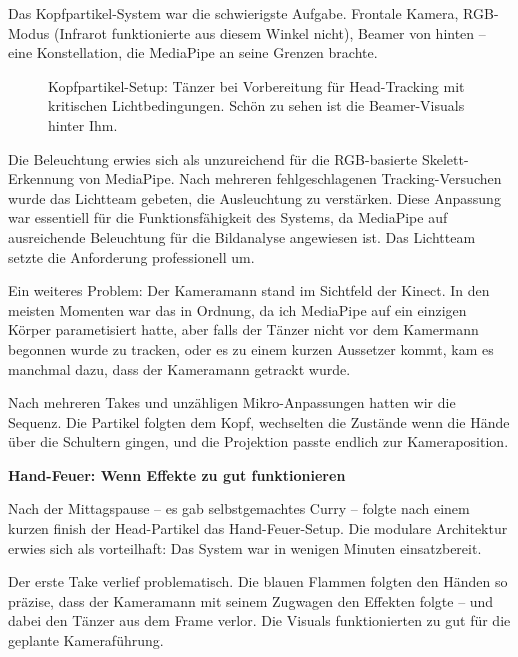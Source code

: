 \raggedright Das Kopfpartikel-System war die schwierigste Aufgabe. Frontale Kamera, RGB-Modus (Infrarot funktionierte aus diesem Winkel nicht), Beamer von hinten – eine Konstellation, die MediaPipe an seine Grenzen brachte.

\begin{figure}[htbp]
    \centering
    \caption{Kopfpartikel-Setup: Tänzer bei Vorbereitung für Head-Tracking mit kritischen Lichtbedingungen. Schön zu sehen ist die Beamer-Visuals hinter Ihm.}
    \label{fig:dancer_head_tracking}
\end{figure}


Die Beleuchtung erwies sich als unzureichend für die RGB-basierte Skelett-Erkennung von MediaPipe. Nach mehreren fehlgeschlagenen Tracking-Versuchen wurde das Lichtteam gebeten, die Ausleuchtung zu verstärken. Diese Anpassung war essentiell für die Funktionsfähigkeit des Systems, da MediaPipe auf ausreichende Beleuchtung für die Bildanalyse angewiesen ist. Das Lichtteam setzte die Anforderung professionell um.



Ein weiteres Problem: Der Kameramann stand im Sichtfeld der Kinect. In den meisten Momenten war das in Ordnung, da ich MediaPipe auf ein einzigen Körper parametisiert hatte, aber falls der Tänzer nicht vor dem Kamermann begonnen wurde zu tracken, oder es zu einem kurzen Aussetzer kommt, kam es manchmal dazu, dass der Kameramann getrackt wurde.

Nach mehreren Takes und unzähligen Mikro-Anpassungen hatten wir die Sequenz. Die Partikel folgten dem Kopf, wechselten die Zustände wenn die Hände über die Schultern gingen, und die Projektion passte endlich zur Kameraposition.


\newpage

\textbf{Hand-Feuer: Wenn Effekte zu gut funktionieren}

\raggedright Nach der Mittagspause – es gab selbstgemachtes Curry – folgte nach einem kurzen finish der Head-Partikel das Hand-Feuer-Setup. Die modulare Architektur erwies sich als vorteilhaft: Das System war in wenigen Minuten einsatzbereit.


Der erste Take verlief problematisch. Die blauen Flammen folgten den Händen so präzise, dass der Kameramann mit seinem Zugwagen den Effekten folgte – und dabei den Tänzer aus dem Frame verlor. Die Visuals funktionierten zu gut für die geplante Kameraführung.

